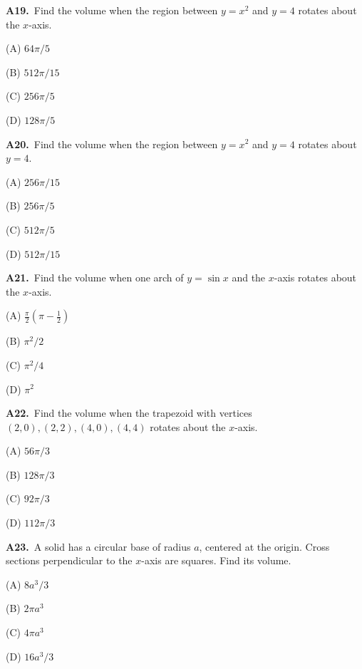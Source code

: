 \documentclass[11pt]{article}
\begin{document}
\bigskip\noindent\textbf{A19.}\ Find the volume when the region between $y=x^2$ and $y=4$ rotates about the $x$-axis.
\begin{list}{}{\setlength{\leftmargin}{3em}\setlength{\labelwidth}{2.5em}\setlength{\itemsep}{0pt}\setlength{\topsep}{2pt}}
\item[(A)] $64\pi/5$
\item[(B)] $512\pi/15$
\item[(C)] $256\pi/5$
\item[(D)] $128\pi/5$
\end{list}

\bigskip\noindent\textbf{A20.}\ Find the volume when the region between $y=x^2$ and $y=4$ rotates about $y=4$.
\begin{list}{}{\setlength{\leftmargin}{3em}\setlength{\labelwidth}{2.5em}\setlength{\itemsep}{0pt}\setlength{\topsep}{2pt}}
\item[(A)] $256\pi/15$
\item[(B)] $256\pi/5$
\item[(C)] $512\pi/5$
\item[(D)] $512\pi/15$
\end{list}

\bigskip\noindent\textbf{A21.}\ Find the volume when one arch of $y=\sin x$ and the $x$-axis rotates about the $x$-axis.
\begin{list}{}{\setlength{\leftmargin}{3em}\setlength{\labelwidth}{2.5em}\setlength{\itemsep}{0pt}\setlength{\topsep}{2pt}}
\item[(A)] $\tfrac\pi2(\pi-\tfrac12)$
\item[(B)] $\pi^2/2$
\item[(C)] $\pi^2/4$
\item[(D)] $\pi^2$
\end{list}

\bigskip\noindent\textbf{A22.}\ Find the volume when the trapezoid with vertices $(2,0),(2,2),(4,0),(4,4)$ rotates about the $x$-axis.
\begin{list}{}{\setlength{\leftmargin}{3em}\setlength{\labelwidth}{2.5em}\setlength{\itemsep}{0pt}\setlength{\topsep}{2pt}}
\item[(A)] $56\pi/3$
\item[(B)] $128\pi/3$
\item[(C)] $92\pi/3$
\item[(D)] $112\pi/3$
\end{list}

\bigskip\noindent\textbf{A23.}\ A solid has a circular base of radius $a$, centered at the origin. Cross sections perpendicular to the $x$-axis are squares. Find its volume.
\begin{list}{}{\setlength{\leftmargin}{3em}\setlength{\labelwidth}{2.5em}\setlength{\itemsep}{0pt}\setlength{\topsep}{2pt}}
\item[(A)] $8a^3/3$
\item[(B)] $2\pi a^3$
\item[(C)] $4\pi a^3$
\item[(D)] $16a^3/3$
\end{list}
\end{document}
